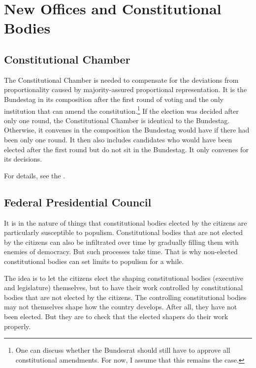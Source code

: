 \section{New Offices and Constitutional Bodies}

\subsection{Constitutional Chamber} \label{subsec:constitutional_chamber}

The Constitutional Chamber is needed to compensate for the deviations from proportionality caused by majority-assured proportional representation.
It is the Bundestag in its composition after the first round of voting and the only institution that can amend the constitution.\footnote{One can discuss whether the Bundesrat should still have to approve all constitutional amendments. For now, I assume that this remains the case.}
If the election was decided after only one round, the Constitutional Chamber is identical to the Bundestag.
Otherwise, it convenes in the composition the Bundestag would have if there had been only one round.
It then also includes candidates who would have been elected after the first round but do not sit in the Bundestag.
It only convenes for its decisions.

For details, see the .

\subsection{Federal Presidential Council} \label{subsec:presidential_council}

It is in the nature of things that constitutional bodies elected by the citizens are particularly susceptible to populism.
Constitutional bodies that are not elected by the citizens can also be infiltrated over time by gradually filling them with enemies of democracy.
But such processes take time.
That is why non-elected constitutional bodies can set limits to populism for a while.

The idea is to let the citizens elect the shaping constitutional bodies (executive and legislature) themselves,
but to have their work controlled by constitutional bodies that are not elected by the citizens.
The controlling constitutional bodies may not themselves shape how the country develops.
After all, they have not been elected.
But they are to check that the elected shapers do their work properly.

